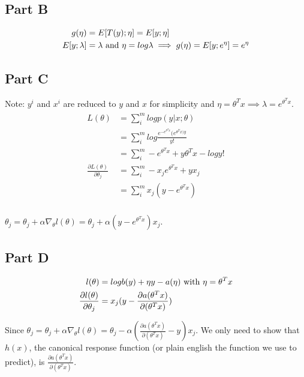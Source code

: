 \documentclass[11pt]{article}
\begin{document}
\subsection*{Part B}
\begin{align}
	\begin{split}
		g(\eta) &= E[T(y);\eta] = E[y;\eta] \\
		E[y;\lambda] &= \lambda \textnormal{ and } \eta = log\lambda \implies g(\eta) = E[y;e^\eta]=e^\eta
	\end{split}
\end{align}

\subsection*{Part C}
Note: $y^{i}$ and $x^{i}$ are reduced to $y$ and $x$ for simplicity and $\eta = \theta^{T}x 
\implies \lambda = e^{\theta^Tx}$.
\begin{align}
	\begin{split}
		L(\theta) &= \sum_{i}^{m}logp(y|x;\theta) \\
							&= \sum_{i}^{m}log\frac{e^{-e^{\theta^Tx}}(e^{\theta^Tx)y}}{y!} \\
							&= \sum_{i}^{m}-e^{\theta^Tx} + y\theta^Tx - logy! \\
		\frac{\partial L(\theta)}{\partial \theta_j} &= \sum_{i}^{m}-x_je^{\theta^Tx} + yx_j \\
																								 &= \sum_{i}^{m}x_j(y-e^{\theta^Tx}) \\
	\end{split}
\end{align}

$\theta_j = \theta_j + \alpha \nabla_{\theta}l(\theta) = \theta_j + \alpha(y-e^{\theta^Tx})x_j$.

\subsection*{Part D}
\begin{align}
	\begin{split}
		l(\theta) &= logb(y) + \eta y - a(\eta) \textnormal{ with } \eta = \theta^Tx \\
		\frac{\partial l(\theta)}{\partial \theta_j} &= x_j(y - \frac{\partial a(\theta^Tx)}{\partial (\theta^Tx)}) \\
	\end{split}
\end{align}

Since $\theta_j = \theta_j + \alpha \nabla_{\theta}l(\theta) = \theta_j - \alpha(\frac{\partial 
a(\theta^Tx)}{\partial (\theta^Tx)} - y)x_j$. We only need to show that $h(x)$, the canonical 
response function (or plain english the function we use to predict), is $\frac{\partial
a(\theta^Tx)}{\partial (\theta^Tx)}$.  
\end{document}

